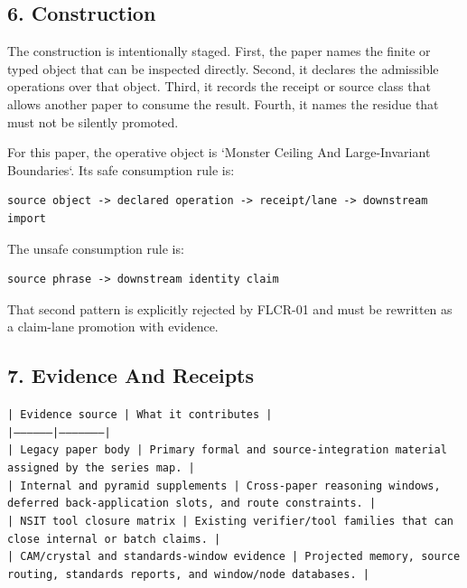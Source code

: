 \documentclass[11pt]{article}
\begin{document}
\subsection*{6. Construction}

The construction is intentionally staged. First, the paper names the finite or
typed object that can be inspected directly. Second, it declares the admissible
operations over that object. Third, it records the receipt or source class that
allows another paper to consume the result. Fourth, it names the residue that
must not be silently promoted.

For this paper, the operative object is `Monster Ceiling And Large-Invariant Boundaries`. Its safe consumption
rule is:

\begin{verbatim}
source object -> declared operation -> receipt/lane -> downstream import
\end{verbatim}

The unsafe consumption rule is:

\begin{verbatim}
source phrase -> downstream identity claim
\end{verbatim}

That second pattern is explicitly rejected by FLCR-01 and must be rewritten as
a claim-lane promotion with evidence.

\subsection*{7. Evidence And Receipts}

\noindent\texttt{| Evidence source | What it contributes |}\\
\noindent\texttt{|-----------------|---------------------|}\\
\noindent\texttt{| Legacy paper body | Primary formal and source-integration material assigned by the series map. |}\\
\noindent\texttt{| Internal and pyramid supplements | Cross-paper reasoning windows, deferred back-application slots, and route constraints. |}\\
\noindent\texttt{| NSIT tool closure matrix | Existing verifier/tool families that can close internal or batch claims. |}\\
\noindent\texttt{| CAM/crystal and standards-window evidence | Projected memory, source routing, standards reports, and window/node databases. |}\\
\end{document}
